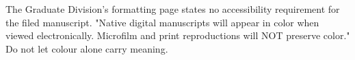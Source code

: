 %


%


	{The Graduate Division's formatting page states no accessibility
	 requirement for the filed manuscript.}
	{"Native digital manuscripts will appear in color when viewed
	 electronically. Microfilm and print reproductions will NOT preserve color."
	 Do not let colour alone carry meaning.}

